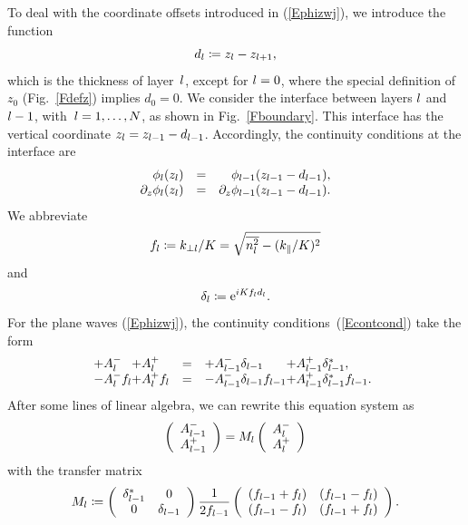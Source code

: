 To deal with the coordinate offsets introduced in (\ref{Ephizwj}),
we introduce the function
\begin{equation}
  d_l\coloneqq z_{l}-z_{l+1},
\end{equation}
which is the thickness of layer~$l$,
except for $l=0$,
where the special definition of $z_0$ (Fig.~\ref{Fdefz}) implies $d_0=0$.
We consider the interface between layers $l$ and $l-1$,
with~$l=1,\ldots,N$, as shown in Fig.~\ref{Fboundary}.
This interface has the vertical coordinate $z_{l}=z_{l-1}-d_{l-1}$.
Accordingly, the continuity conditions at the interface are
\begin{equation}\label{Econtcond}
  \begin{array}{lcl}
 \hphantom{\partial_z}\phi_{l}(z_{l}) &=& \hphantom{\partial_z}\phi_{l-1}(z_{l-1}-d_{l-1}),\\
           \partial_z \phi_{l}(z_{l}) &=&           \partial_z \phi_{l-1}(z_{l-1}-d_{l-1}).
  \end{array}
\end{equation}
We abbreviate
\begin{equation}
  f_l \coloneqq  k_{\perp l}/K = \sqrt{\overline{n_l^2}-(k_\parallel/K)^2}
\end{equation}
and
\begin{equation}
   \delta_l \coloneqq  \text{e}^{iKf_l d_l}.
\end{equation}
For the plane waves (\ref{Ephizwj}),
the continuity conditions~(\ref{Econtcond}) take the form
\begin{equation}\label{Econt2}
  \begin{array}{@{}l@{}lcl@{}l}
  +A^-_{\il} &+A^+_{\il}
  &=&
  +A^-_{\il-1}\delta_{\il-1} &+A^+_{\il-1}\delta_{\il-1}^*,
  \\
  -A^-_{\il} f_{\il}  &+A^+_{\il} f_{\il}
  &=&
  -A^-_{\il-1}\delta_{\il-1} f_{\il-1} &+A^+_{\il-1}\delta_{\il-1}^* f_{\il-1}.
  \end{array}
\end{equation}
After some lines of linear algebra,
we can rewrite this equation system as
\begin{equation}\label{EcMc}
  \left( \begin{array}{c}A^-_{l-1}\\ A^+_{l-1}\end{array} \right)
  = M_{l} \left( \begin{array}{c}A^-_{l}\\A^+_{l}\end{array} \right)
\end{equation}
with the transfer matrix
\begin{equation}\label{EMil}
  M_l
   \coloneqq
   \left(\begin{array}{cc}
       \delta_{l-1}^*&0\\
       0 & \delta_{l-1}
   \end{array}\right)
   \frac{1}{2f_{l-1}}
   \left(\begin{array}{cc}
       (f_{l-1}+f_{l})&(f_{l-1}-f_{l})\\
       (f_{l-1}-f_{l})&(f_{l-1}+f_{l})
   \end{array}\right).
\end{equation}

